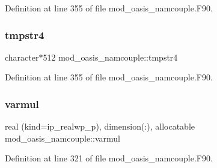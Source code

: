 Definition at line 355 of file mod\+\_\+oasis\+\_\+namcouple.\+F90.

\mbox{\label{namespacemod__oasis__namcouple_ada1acbaf7e666b7220e3b7fb8d0f2549}} 
\subsubsection{\texorpdfstring{tmpstr4}{tmpstr4}}
{\footnotesize\ttfamily character$\ast$512 mod\+\_\+oasis\+\_\+namcouple\+::tmpstr4\hspace{0.3cm}{\ttfamily [private]}}



Definition at line 355 of file mod\+\_\+oasis\+\_\+namcouple.\+F90.

\mbox{\label{namespacemod__oasis__namcouple_ab7c38fd6bd90bb8e6ebfb539ead1f1a9}} 
\subsubsection{\texorpdfstring{varmul}{varmul}}
{\footnotesize\ttfamily real (kind=ip\+\_\+realwp\+\_\+p), dimension(\+:), allocatable mod\+\_\+oasis\+\_\+namcouple\+::varmul\hspace{0.3cm}{\ttfamily [private]}}



Definition at line 321 of file mod\+\_\+oasis\+\_\+namcouple.\+F90.

